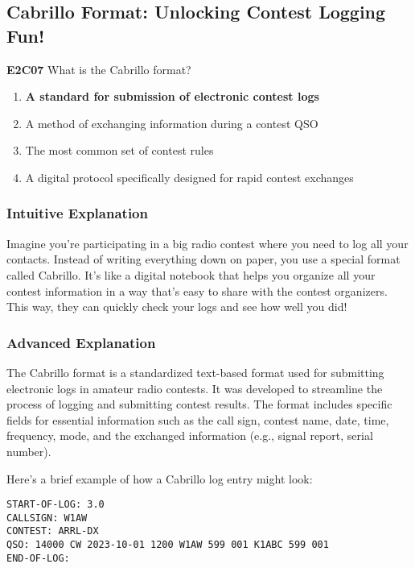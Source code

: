 \subsection{Cabrillo Format: Unlocking Contest Logging Fun!}

\begin{tcolorbox}[colback=gray!10!white,colframe=black!75!black,title=Multiple Choice Question]
\textbf{E2C07} What is the Cabrillo format?

\begin{enumerate}[label=\Alph*.]
    \item \textbf{A standard for submission of electronic contest logs}
    \item A method of exchanging information during a contest QSO
    \item The most common set of contest rules
    \item A digital protocol specifically designed for rapid contest exchanges
\end{enumerate}
\end{tcolorbox}

\subsubsection{Intuitive Explanation}
Imagine you’re participating in a big radio contest where you need to log all your contacts. Instead of writing everything down on paper, you use a special format called Cabrillo. It’s like a digital notebook that helps you organize all your contest information in a way that’s easy to share with the contest organizers. This way, they can quickly check your logs and see how well you did!

\subsubsection{Advanced Explanation}
The Cabrillo format is a standardized text-based format used for submitting electronic logs in amateur radio contests. It was developed to streamline the process of logging and submitting contest results. The format includes specific fields for essential information such as the call sign, contest name, date, time, frequency, mode, and the exchanged information (e.g., signal report, serial number).

Here’s a brief example of how a Cabrillo log entry might look:

\begin{verbatim}
START-OF-LOG: 3.0
CALLSIGN: W1AW
CONTEST: ARRL-DX
QSO: 14000 CW 2023-10-01 1200 W1AW 599 001 K1ABC 599 001
END-OF-LOG:
\end{verbatim}

